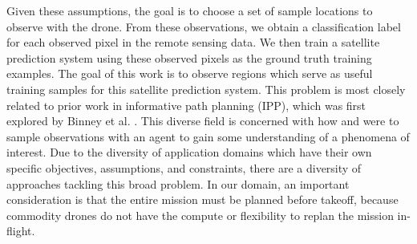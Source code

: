 Given these assumptions, the goal is to choose a set of sample locations to observe with the drone. From these observations, we obtain a classification label for each observed pixel in the remote sensing data. We then train a satellite prediction system using these observed pixels as the ground truth training examples. The goal of this work is to observe regions which serve as useful training samples for this satellite prediction system. 
This problem is most closely related to prior work in informative path planning (IPP), which was first explored by Binney et al. \cite{Binney2013OptimizingPhenomena}. This diverse field is concerned with how and were to sample observations with an agent to gain some understanding of a phenomena of interest. Due to the diversity of application domains which have their own specific objectives, assumptions, and constraints, there are a diversity of approaches tackling this broad problem. In our domain, an important consideration is that the entire mission must be planned before takeoff, because commodity drones do not have the compute or flexibility to replan the mission in-flight.



